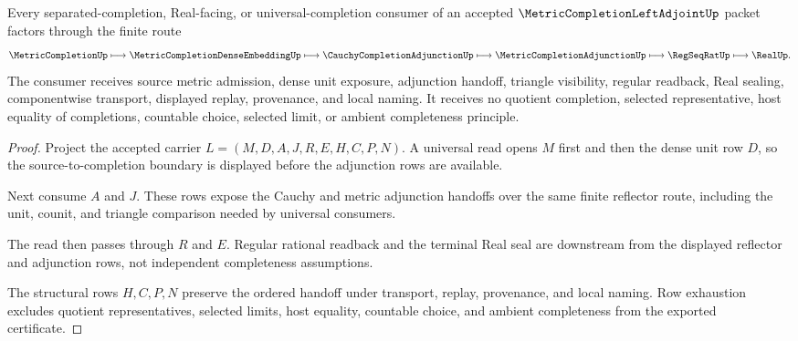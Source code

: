 \begin{theorem}
\label{thm:metric-completion-left-adjoint-universal-handoff}
Every separated-completion, Real-facing, or universal-completion consumer of an accepted $\MetricCompletionLeftAdjointUp$ packet factors through the finite route
$$
\MetricCompletionUp
\longmapsto
\MetricCompletionDenseEmbeddingUp
\longmapsto
\CauchyCompletionAdjunctionUp
\longmapsto
\MetricCompletionAdjunctionUp
\longmapsto
\RegSeqRatUp
\longmapsto
\RealUp .
$$
The consumer receives source metric admission, dense unit exposure, adjunction handoff, triangle visibility, regular readback, Real sealing, componentwise transport, displayed replay, provenance, and local naming. It receives no quotient completion, selected representative, host equality of completions, countable choice, selected limit, or ambient completeness principle.
\end{theorem}
\begin{proof}
Project the accepted carrier $L=(M,D,A,J,R,E,H,C,P,N)$. A universal read opens $M$ first and then the dense unit row $D$, so the source-to-completion boundary is displayed before the adjunction rows are available.

Next consume $A$ and $J$. These rows expose the Cauchy and metric adjunction handoffs over the same finite reflector route, including the unit, counit, and triangle comparison needed by universal consumers.

The read then passes through $R$ and $E$. Regular rational readback and the terminal Real seal are downstream from the displayed reflector and adjunction rows, not independent completeness assumptions.

The structural rows $H,C,P,N$ preserve the ordered handoff under transport, replay, provenance, and local naming. Row exhaustion excludes quotient representatives, selected limits, host equality, countable choice, and ambient completeness from the exported certificate.
\end{proof}



